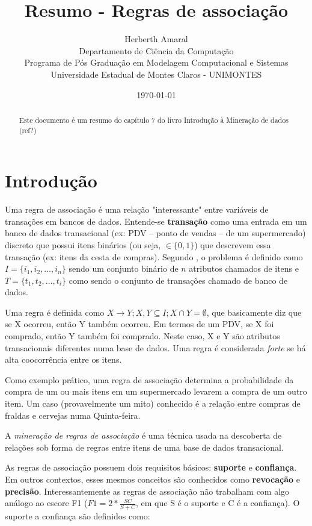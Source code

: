 \documentclass[12pt]{article}
\title{Resumo - Regras de associação}
\author{
Herberth Amaral \\
Departamento de Ciência da Computação\\
Programa de Pós Graduação em Modelagem Computacional e Sistemas\\
Universidade Estadual de Montes Claros - UNIMONTES\\
}
\date{\today}
\begin{document}
\maketitle

\begin{abstract}
    Este documento é um resumo do capítulo 7 do livro Introdução à Mineração de dados (ref?)
\end{abstract}

\section{Introdução}

Uma regra de associação é uma relação "interessante" entre variáveis de
transações em bancos de dados. Entende-se \textbf{transação} como uma entrada
em um banco de dados transacional (ex: PDV -- ponto de vendas -- de um
supermercado) discreto que possui itens binários (ou seja, $\in \{0,1\}$) que
descrevem essa transação (ex: itens da cesta de compras).  Segundo
\cite{agrawal}, o problema é definido como $I = \{i_1, i_2, \ldots, i_n\}$
sendo um conjunto binário de $n$ atributos chamados de itens e $T = \{t_1, t_2, \ldots, t_i\}$ 
como sendo o conjunto de transações chamado de banco de dados. 

Uma regra é definida como $X \rightarrow Y; X,Y \subseteq I; X \cap Y = \emptyset$, 
que basicamente diz que se X ocorreu, então Y também ocorreu. Em
termos de um PDV, se X foi comprado, então Y também foi comprado. Neste caso, X
e Y são atributos transacionais diferentes numa base de dados. Uma regra é
considerada \textit{forte} se há alta coocorrência entre os itens.

Como exemplo prático, uma regra de associação determina a probabilidade da
compra de um ou mais itens em um supermercado levarem a compra de um outro
item. Um caso (provavelmente um mito) conhecido é a relação entre compras de
fraldas e cervejas numa Quinta-feira.

A \textit{mineração de regras de associação} é uma técnica usada na descoberta
de relações sob forma de regras entre itens de uma base de dados transacional.

As regras de associação possuem dois requisitos básicos: \textbf{suporte} e
\textbf{confiança}. Em outros contextos, esses mesmos conceitos são conhecidos
como \textbf{revocação} e \textbf{precisão}. Interessantemente as regras de
associação não trabalham com algo análogo ao escore F1 ($F1 = 2 * \frac{SC}{S+C}$, 
em que S é o suporte e C é a confiança). O suporte a confiança são definidos como:
\end{document}
